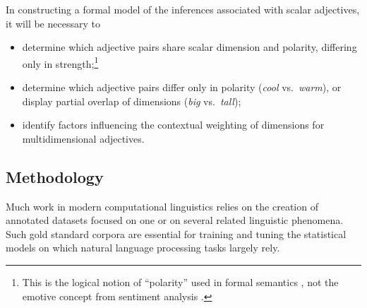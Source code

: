 \documentclass[10pt]{article}
\begin{document}
In constructing a formal model of the inferences associated with scalar adjectives, it will be necessary to 
 \vspace{-.25in}
\begin{itemize}
\item [1.] determine which adjective pairs share scalar dimension and polarity, differing only in strength;\footnote{\label{polarity}This is the logical notion of ``polarity'' used in formal semantics \cite{kennedy2001polar}, not the emotive concept from sentiment analysis \cite{wilson2009recognizing,williams2009predicting}.}
\item [2.] determine which adjective pairs differ only in polarity (\emph{cool} vs.\ \emph{warm}), or display partial overlap of dimensions (\emph{big} vs.\ \emph{tall});
\item [3.] identify factors influencing the contextual weighting of dimensions for multidimensional adjectives.\end{itemize}
 \vspace{-.05in}


\vspace {-3mm}


\subsection{Methodology\label{prelim}}
\vspace {-3mm}

Much work in modern computational linguistics relies on the creation of annotated datasets focused on one or on several related linguistic phenomena. Such gold standard corpora are essential for training and tuning the statistical models on which natural language processing tasks largely rely.
\end{document}
